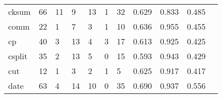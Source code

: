 \begin{longtable}{lp{1.2cm}p{1.2cm}p{1.2cm}p{1.2cm}p{1.2cm}p{1.2cm}p{1.2cm}p{1.2cm}p{1.2cm}p{1.2cm}}
cksum     &                                    66 &                                                 11 &                                                  9 &                                                 13 &                                                  1 &                                                 32 &                                         0.629 &                                              0.833 &                                              0.485 \\
comm      &                                    22 &                                                  1 &                                                  7 &                                                  3 &                                                  1 &                                                 10 &                                         0.636 &                                              0.955 &                                              0.455 \\
cp        &                                    40 &                                                  3 &                                                 13 &                                                  4 &                                                  3 &                                                 17 &                                         0.613 &                                              0.925 &                                              0.425 \\
csplit    &                                    35 &                                                  2 &                                                 13 &                                                  5 &                                                  0 &                                                 15 &                                         0.593 &                                              0.943 &                                              0.429 \\
cut       &                                    12 &                                                  1 &                                                  3 &                                                  2 &                                                  1 &                                                  5 &                                         0.625 &                                              0.917 &                                              0.417 \\
date      &                                    63 &                                                  4 &                                                 14 &                                                 10 &                                                  0 &                                                 35 &                                         0.690 &                                              0.937 &                                              0.556 \\

\end{longtable}
